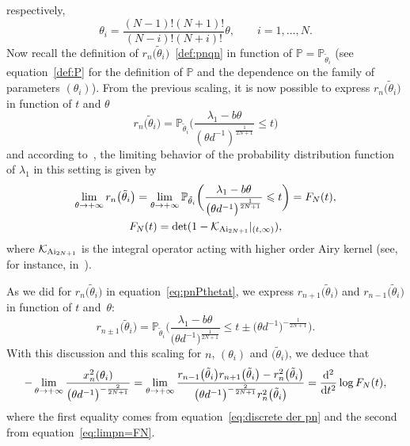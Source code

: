\documentclass[pdftex]{sigma}%
\numberwithin{equation}{section}
\newcommand{\Ai}{{\rm Ai}}
\begin{document}
respectively,
\begin{equation}
\label{eq:scaling of theta i}
\theta_i=\frac{(N-1)!(N+1)!}{(N-i)!(N+i)!}\theta, \qquad i=1,\dots, N.
\end{equation}
Now recall the definition of $r_n\big(\tilde{\theta}_i\big)$~\eqref{def:pnqn} in function of $\mathbb{P}=\mathbb{P}_{\tilde{\theta}_i}$ (see equation~\eqref{def:P} for the definition of $\mathbb{P}$ and the dependence on the family of parameters $(\theta_i)$). From the previous scaling, it is now possible to express $r_n\big(\tilde{\theta}_i\big)$ in function of $t$ and $\theta$
\begin{equation}
\label{eq:pnPthetat}
r_n\big(\tilde{\theta}_i\big)=\mathbb{P}_{\tilde{\theta}_i}\bigg(\frac{\lambda_1-b\theta}{(\theta d^{-1})^{\frac{1}{2N+1}}}\leqslant t\bigg)
\end{equation}
 and according to~\cite[Theorem 1]{betea2021multicritical}, the limiting behavior of the probability distribution function of $\lambda_1$ in this setting is given by
\begin{gather}
\lim_{\theta \rightarrow +\infty} r_n\big(\tilde{\theta}_i\big)=\lim_{\theta \rightarrow +\infty} \mathbb{P}_{\tilde{\theta}_i} \bigg(\frac{\lambda_1 -b\theta}{\big(\theta d^{-1}\big)^{\frac{1}{2N+1}}}\leqslant t\bigg)=	F_N(t), \nonumber\\
F_N(t)=\det(1-\mathcal{K}_{\Ai_{2N+1}}|_{(t,\infty)}),\label{eq:limpn=FN}
\end{gather}
where $\mathcal{K}_{\Ai_{2N+1}}$ is the integral operator acting with higher order Airy kernel (see, for instance, in~\cite[equation~(2.7)]{betea2021multicritical}).

As we did for $r_n\big(\tilde{\theta}_i\big)$ in equation~\eqref{eq:pnPthetat}, we express $r_{n+1}\big(\tilde{\theta}_i\big)$ and $r_{n-1}\big(\tilde{\theta}_i\big)$ in function of $t$ and~$\theta$:
\begin{equation*}
r_{n\pm 1}\big(\tilde{\theta}_i\big)=\mathbb{P}_{\tilde{\theta}_i}\bigg(\frac{\lambda_1-b\theta}{\big(\theta d^{-1}\big)^{\frac{1}{2N+1}}}\leqslant t\pm\big(\theta d^{-1}\big)^{-\frac{1}{2N+1}}\bigg).
\end{equation*}
With this discussion and this scaling for $n$, $(\theta_i)$ and $\big(\tilde{\theta}_i\big)$, we deduce that{\samepage
\begin{equation*}
-\lim_{\theta \rightarrow +\infty}\dfrac{x_n^2(\theta_i)}{\big(\theta d^{-1}\big)^{-\frac{2}{2N+1}}}=\lim_{\theta \rightarrow +\infty}\frac{r_{n-1}\big(\tilde{\theta}_i\big)r_{n+1}\big(\tilde{\theta}_i\big)-r_{n}^2\big(\tilde{\theta}_i\big)}{\big(\theta d^{-1}\big)^{-\frac{2}{2N+1}}r_{n}^2\big(\tilde{\theta}_i\big)}= \frac{{\rm d}^2}{{\rm d}t^2} \log F_N(t),
\end{equation*}
where the first equality comes from equation~\eqref{eq:discrete der pn} and the second from equation~\eqref{eq:limpn=FN}.}
\end{document}

